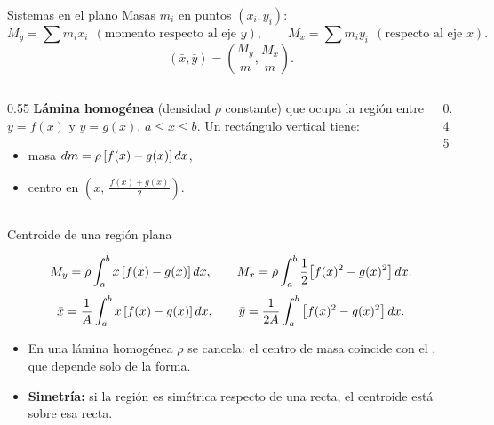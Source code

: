 \documentclass[10pt,aspectratio=169]{beamer}
\begin{document}
\begin{frame}{Sistemas en el plano}
  Masas $m_i$ en puntos $(x_i,y_i)$:
  \[ M_y=\sum m_ix_i\ \ (\text{momento respecto al eje }y),\qquad M_x=\sum m_iy_i\ \ (\text{respecto al eje }x). \]
  \[ (\bar x,\bar y)=\left(\frac{M_y}{m},\frac{M_x}{m}\right). \]
  \begin{columns}
    \begin{column}{0.55\textwidth}
      \textbf{Lámina homogénea} (densidad $\rho$ constante) que ocupa la región entre $y=f(x)$ y $y=g(x)$, $a\le x\le b$.
      Un rectángulo vertical tiene:
      \begin{itemize}
        \item masa $dm=\rho\,[f(x)-g(x)]\,dx$,
        \item centro en $\left(x,\ \frac{f(x)+g(x)}{2}\right)$.
      \end{itemize}
    \end{column}
    \begin{column}{0.45\textwidth}
      \centering
    \end{column}
  \end{columns}
\end{frame}

\begin{frame}{Centroide de una región plana}
  \begin{teorema}
    \[ M_y=\rho\int_a^bx\,[f(x)-g(x)]\,dx,\qquad M_x=\rho\int_a^b\frac12\big[f(x)^2-g(x)^2\big]\,dx. \]
    \[ \bar x=\frac1A\int_a^bx\,[f(x)-g(x)]\,dx,\qquad \bar y=\frac{1}{2A}\int_a^b\big[f(x)^2-g(x)^2\big]\,dx. \]
  \end{teorema}
  \begin{observacion}
    \begin{itemize}
      \item En una lámina homogénea $\rho$ se cancela: el centro de masa coincide con el , que depende solo de la forma.
      \item \textbf{Simetría:} si la región es simétrica respecto de una recta, el centroide está sobre esa recta.
    \end{itemize}
  \end{observacion}
\end{frame}
\end{document}
